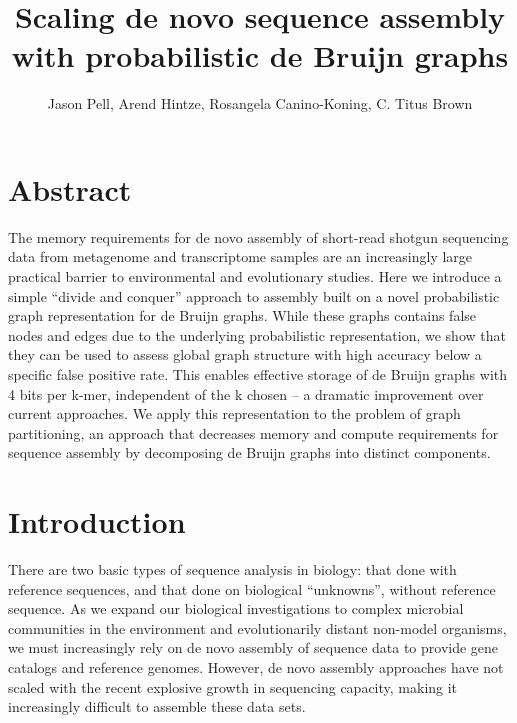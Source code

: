 \documentclass[12pt]{article} \usepackage{simplemargins}
\begin{document}
\title{Scaling de novo sequence assembly with probabilistic de Bruijn graphs}
\author{Jason Pell, Arend Hintze, Rosangela Canino-Koning, C. Titus Brown}

\maketitle

\section{Abstract}

The memory requirements for de novo assembly of short-read shotgun
sequencing data from metagenome and transcriptome samples are an
increasingly large practical barrier to environmental and evolutionary
studies.  Here we introduce a simple ``divide and conquer'' approach
to assembly built on a novel probabilistic graph representation for de
Bruijn graphs.  While these graphs contains false nodes and edges due
to the underlying probabilistic representation, we show that they can
be used to assess global graph structure with high accuracy below a
specific false positive rate.  This enables effective storage of de
Bruijn graphs with 4 bits per k-mer, independent of the k chosen -- a
dramatic improvement over current approaches.  We apply this
representation to the problem of graph partitioning, an approach that
decreases memory and compute requirements for sequence assembly by
decomposing de Bruijn graphs into distinct components.

\section{Introduction}

There are two basic types of sequence analysis in biology: that done
with reference sequences, and that done on biological ``unknowns'',
without reference sequence.  As we expand our biological
investigations to complex microbial communities in the environment and
evolutionarily distant non-model organisms, we must increasingly rely
on de novo assembly of sequence data to provide gene catalogs and
reference genomes.  However, de novo assembly approaches have not
scaled with the recent explosive growth in sequencing capacity, making
it increasingly difficult to assemble these data sets.
\end{document}
